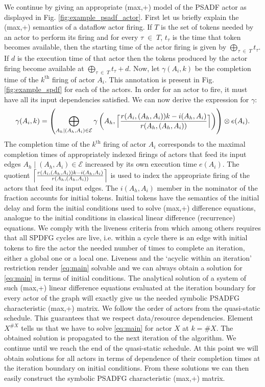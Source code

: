 \documentclass[]{eptcs}
\DeclarePairedDelimiter{\ceil}{\lceil}{\rceil}
\begin{document}
We continue by giving an appropriate (max,+) model of the PSADF actor as displayed in Fig. \ref{fig:example_psadf_actor}. First let us briefly explain the (max,+) semantics of a dataflow actor firing. If $T$ is the set of tokens needed by an actor to perform its firing and for every $\tau \; \in \;  T$, $t_\tau$ is the time that token becomes available, then the starting time of the actor firing is given by $\bigoplus \limits_{\tau \; \in \; T} t_\tau$. If $d$ is the execution time of that actor then the tokens produced by the actor firing become available at $\bigoplus \limits_{\tau \; \in \; T} t_\tau + d$.
Now, let $\gamma(A_i,k)$ be the completion time of the $k^{\mathrm{th}}$ firing of actor $A_i$. This annotation is present in Fig. \ref{fig:example_spdf} for each of the actors. 
In order for an actor to fire, it must have all its input dependencies satisfied. We can now derive the expression for $\gamma$:
\begin{equation}
\gamma(A_i, k) = \left( \bigoplus \limits_{A_h \mid (A_h, A_i) \in \mathcal{E} } \gamma\left( A_h, \ceil[\Big]{ \frac{r(A_i, (A_h,A_i))k-i(A_h,A_i)}{r(A_h, (A_h,A_i))} } \right)  \right) \otimes e(A_i).
\label{eq:main}
\end{equation} 
The completion time of the $k^{\mathrm{th}}$ firing of actor $A_i$ corresponds to the maximal completion times of appropriately indexed firings of actors that feed its input edges $A_h \mid (A_h, A_i) \in \mathcal{E}$ increased by its own execution time $e(A_i)$. The quotient $ \ceil[\Big]{ \frac{r(A_i, (A_h,A_i))k-i(A_h,A_i)}{r(A_h, (A_h,A_i))} }$ is used to index the appropriate firing of the actors that feed its input edges. The $i(A_h,A_i)$ member in the nominator of the fraction accounts for initial tokens. Initial tokens have the semantics of the initial delay and form the initial conditions used to solve (max,+) difference equations, analogue to the initial conditions in classical linear difference (recurrence) equations. We comply with the liveness criteria from \cite{2frad:all} which among others requires that all SPDFG cycles are live, i.e. within a cycle there is an edge with initial tokens to fire the actor the needed number of times to complete an iteration, either a global one or a local one. Liveness and the `acyclic within an iteration' restriction render \eqref{eq:main} solvable and we can always obtain a solution for \eqref{eq:main} in terms of initial conditions. The analytical solution of a system of such (max,+) linear difference equations evaluated at the iteration boundary for every actor of the graph will exactly give us the needed symbolic PSADFG characteristic (max,+) matrix. We follow the order of actors from the quasi-static schedule. This guarantees that we respect data/resource dependencies. Element $X^{\#X}$ tells us that we have to solve \eqref{eq:main} for actor $X$ at $k=\#X$. The obtained solution is propagated to the next iteration of the algorithm. We continue until we reach the end of the quasi-static schedule. At this point we will obtain solutions for all actors in terms of dependence of their completion times at the iteration boundary on initial conditions. From these solutions we can then easily construct the symbolic PSADFG characteristic (max,+) matrix. 
\end{document}
